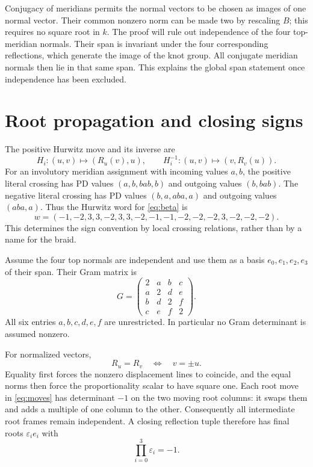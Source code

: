 \documentclass[11pt]{article}
\begin{document}
Conjugacy of meridians permits the normal vectors to be chosen as
images of one normal vector. Their common nonzero norm can be made
two by rescaling $B$; this requires no square root in $k$.
The proof will rule out independence of the four top-meridian normals.
Their span is invariant under the four corresponding reflections,
which generate the image of the knot group. All conjugate meridian
normals then lie in that same span. This explains the global span
statement once independence has been excluded.

\section{Root propagation and closing signs}
The positive Hurwitz move and its inverse are
\begin{equation}\label{eq:moves}
 H_i:(u,v)\longmapsto(R_u(v),u),\qquad
 H_i^{-1}:(u,v)\longmapsto(v,R_v(u)).
\end{equation}
For an involutory meridian assignment with incoming values $a,b$,
the positive literal crossing has PD values $(a,b,bab,b)$ and outgoing
values $(b,bab)$. The negative literal crossing has PD values
$(b,a,aba,a)$ and outgoing values $(aba,a)$.
Thus the Hurwitz word for \eqref{eq:beta} is
\begin{equation}\label{eq:w}
 w=(-1,-2,3,3,-2,3,3,-2,-1,-1,-2,-2,-2,3,-2,-2,-2).
\end{equation}
This determines the sign convention by local crossing relations,
rather than by a name for the braid.

Assume the four top normals are independent and use them as a basis
$e_0,e_1,e_2,e_3$ of their span. Their Gram matrix is
\begin{equation}\label{eq:gram}
 G=\begin{pmatrix}
 2&a&b&c\\a&2&d&e\\b&d&2&f\\c&e&f&2
 \end{pmatrix}.
\end{equation}
All six entries $a,b,c,d,e,f$ are unrestricted. In particular no
Gram determinant is assumed nonzero.

For normalized vectors,
\begin{equation}\label{eq:sign}
                R_u=R_v\quad\Longleftrightarrow\quad v=\pm u .
\end{equation}
Equality first forces the nonzero displacement lines to coincide,
and the equal norms then force the proportionality scalar to have
square one. Each root move in \eqref{eq:moves} has determinant $-1$
on the two moving root columns: it swaps them and adds a multiple of
one column to the other. Consequently all intermediate root frames
remain independent. A closing reflection tuple therefore has final
roots $\varepsilon_i e_i$ with
\begin{equation}\label{eq:product}
                    \prod_{i=0}^3\varepsilon_i=-1.
\end{equation}
\end{document}
